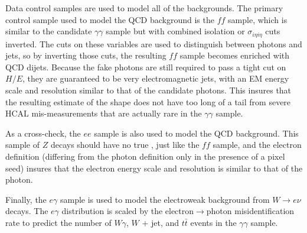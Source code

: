 \documentclass[dissertation.tex]{subfiles}
\begin{document}
Data control samples are used to model all of the backgrounds.  The primary control sample used to model the QCD background is the $\mathit{ff}$ sample, which is similar to the candidate $\gamma\gamma$ sample but with combined isolation or $\sigma_{i\eta i\eta}$ cuts inverted.  The cuts on these variables are used to distinguish between photons and jets, so by inverting those cuts, the resulting $\mathit{ff}$ sample becomes enriched with QCD dijets.  Because the fake photons are still required to pass a tight cut on $H/E$, they are guaranteed to be very electromagnetic jets, with an EM energy scale and resolution similar to that of the candidate photons.  This insures that the resulting estimate of the \MET shape does not have too long of a tail from severe HCAL mis-measurements that are actually rare in the $\gamma\gamma$ sample.



As a cross-check, the $ee$ sample is also used to model the QCD background.  This sample of $Z$ decays should have no true \MET, just like the $\mathit{ff}$ sample, and the electron definition (differing from the photon definition only in the presence of a pixel seed) insures that the electron energy scale and resolution is similar to that of the photon.

Finally, the $e\gamma$ sample is used to model the electroweak background from $W\rightarrow e\nu$ decays.  The $e\gamma$ \MET distribution is scaled by the electron$\rightarrow$photon misidentification rate to predict the number of $W\gamma$, $W$ + jet, and $t\bar{t}$ events in the $\gamma\gamma$ sample.
\end{document}
